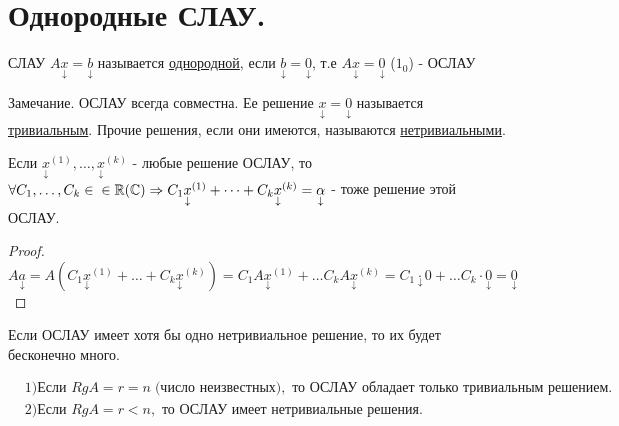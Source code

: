 \documentclass[../main.tex]{subfiles}
\begin{document}
\newpage \section{Однородные СЛАУ.}
\begin{definition}
    СЛАУ $A \underset{\downarrow}{x}= \underset{\downarrow}{b}$ называется \underline{однородной}, если $\underset{\downarrow}{b}=\underset{\downarrow}{0}$, т.е $A \underset{\downarrow}{x}= \underset{\downarrow}{0}$ ($1_{0}$) - ОСЛАУ
\end{definition}
Замечание. ОСЛАУ всегда совместна. Ее решение $\underset{\downarrow}{x}=\underset{\downarrow}{0}$ называется \underline{тривиальным}. Прочие решения, если они имеются, называются \underline{нетривиальными}.
\begin{theorem}
    Если $\underset{\downarrow}{x}^{(1)},\dots, \underset{\downarrow}{x}^{(k)}$ - любые решение ОСЛАУ, то $\forall C_{1},\dots,C_{k}\in \\ \in \mathbb{R}(\mathbb{C})\Rightarrow C_{1}\underset{\downarrow}{x}^{(1)}+\dots+C_{k}\underset{\downarrow}{x}^{(k)}=\underset{\downarrow}{\alpha}$ - тоже решение этой ОСЛАУ.
\end{theorem}
\begin{proof}
    $A\underset{\downarrow}{a}=A(C_{1}\underset{\downarrow}{x}^{(1)}+\dots+C_{k}\underset{\downarrow}{x}^{(k)})=C_{1}A\underset{\downarrow}{x}^{(1)}+\dots C_{k}A \underset{\downarrow}{x}^{(k)}= C_{1}\underset{\downarrow}\cdot{0}+\dots C_{k}\cdot\underset{\downarrow}{0}=\underset{\downarrow}{0}$
\end{proof}
\begin{corollary}
    Если ОСЛАУ имеет хотя бы одно нетривиальное решение, то их будет бесконечно много.
\end{corollary}
\begin{theorem}
    $\begin{aligned} &1) \text{Если } RgA=r=n \;\text{(число неизвестных)},\text{ то ОСЛАУ обладает только тривиальным решением. }\\ &2) \text{Если } RgA=r<n, \text{ то ОСЛАУ имеет нетривиальные решения. }  \end{aligned}$
\end{theorem}
\end{document}
